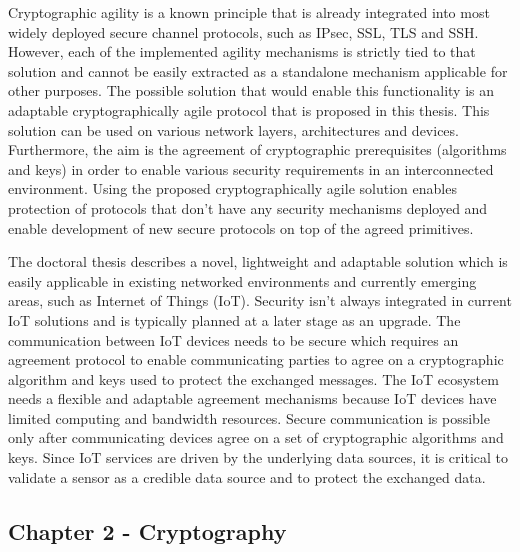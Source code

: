 Cryptographic agility is a known principle that is already integrated into most
widely deployed secure channel protocols, such as IPsec, SSL, TLS and SSH.
However, each of the implemented agility mechanisms is strictly tied to that
solution and cannot be easily extracted as a standalone mechanism
applicable for other purposes. The possible solution that would enable this
functionality is an adaptable cryptographically agile protocol that is proposed
in this thesis. This solution can be used on various network layers,
architectures and devices. Furthermore, the aim is the agreement of
cryptographic prerequisites (algorithms and keys) in order to enable various
security requirements in an interconnected environment. Using the proposed
cryptographically agile solution enables protection of protocols that don’t have
any security mechanisms deployed and enable development of new secure protocols
on top of the agreed primitives.

The doctoral thesis describes a novel, lightweight and adaptable solution which
is
easily applicable in existing networked environments and currently emerging
areas, such as Internet of Things (IoT).
Security isn’t always integrated in current IoT solutions and is typically
planned at a later stage as an upgrade. The communication between IoT devices
needs to be secure which requires an agreement protocol to enable communicating
parties to agree on a cryptographic algorithm and keys used to protect the
exchanged messages. The IoT ecosystem needs a flexible and adaptable agreement
mechanisms because IoT devices have limited computing and bandwidth resources.
Secure communication is possible only after communicating devices agree on a set
of cryptographic algorithms and keys. Since IoT services are driven by the
underlying data sources, it is critical to validate a sensor as a credible data
source and to protect the exchanged data.

\subsection*{Chapter 2 - Cryptography}

